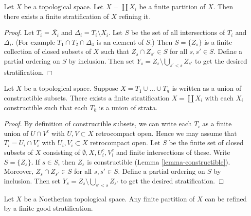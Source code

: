 \begin{lemma}
\label{lemma-partition-refined-by-stratification}
Let $X$ be a topological space. Let $X = \coprod X_i$ be a finite partition
of $X$. Then there exists a finite stratification of $X$ refining it.
\end{lemma}

\begin{proof}
Let $T_i = \overline{X_i}$ and $\Delta_i = T_i \setminus X_i$.
Let $S$ be the set of all intersections of $T_i$ and $\Delta_i$.
(For example $T_1 \cap T_2 \cap \Delta_4$ is an element of $S$.)
Then $S = \{Z_s\}$ is a finite collection of closed subsets of $X$ such that
$Z_s \cap Z_{s'} \in S$ for all $s, s' \in S$. Define a partial ordering
on $S$ by inclusion. Then set $Y_s = Z_s \setminus \bigcup_{s' < s} Z_{s'}$
to get the desired stratification.
\end{proof}

\begin{lemma}
\label{lemma-constructible-partition-refined-by-stratification}
Let $X$ be a topological space. Suppose $X = T_1 \cup \ldots \cup T_n$
is written as a union of constructible subsets. There exists a finite
stratification $X = \coprod X_i$ with each $X_i$ constructible
such that each $T_k$ is a union of strata.
\end{lemma}

\begin{proof}
By definition of constructible subsets, we can write each $T_i$ as a
finite union of $U \cap V^c$ with $U, V \subset X$ retrocompact open.
Hence we may assume that $T_i = U_i \cap V_i^c$
with $U_i, V_i \subset X$ retrocompact open. Let $S$ be the
finite set of closed subsets of $X$ consisting of
$\emptyset, X, U_i^c, V_i^c$ and finite intersections of these.
Write $S = \{Z_s\}$. If $s \in S$, then $Z_s$ is constructible
(Lemma \ref{lemma-constructible}).
Moreover, $Z_s \cap Z_{s'} \in S$ for all $s, s' \in S$.
Define a partial ordering on $S$ by inclusion. Then set
$Y_s = Z_s \setminus \bigcup_{s' < s} Z_{s'}$
to get the desired stratification.
\end{proof}

\begin{lemma}
\label{lemma-noetherian-partition-refined-by-stratification}
Let $X$ be a Noetherian topological space. Any finite partition
of $X$ can be refined by a finite good stratification.
\end{lemma}

